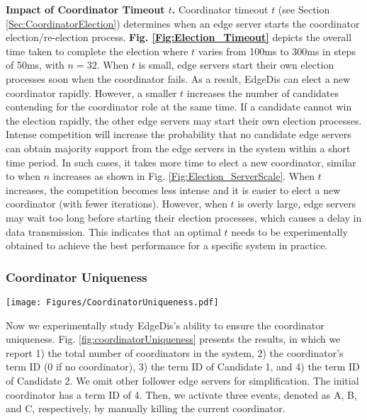 \documentclass[10pt,journal,compsoc]{IEEEtran}
\begin{document}
\smallskip
\textbf{Impact of Coordinator Timeout $t$.} Coordinator timeout $t$ (see Section \ref{Sec:CoordinatorElection}) determines when an edge server starts the coordinator election/re-election process. \textbf{Fig. \ref{Fig:Election_Timeout}} depicts the overall time taken to complete the election where $t$ varies from 100ms to 300ms in steps of 50ms, with $n=32$. When $t$ is small, edge servers start their own election processes soon when the coordinator fails. As a result, EdgeDis can elect a new coordinator rapidly. However, a smaller $t$ increases the number of candidates contending for the coordinator role at the same time. If a candidate cannot win the election rapidly, the other edge servers may start their own election processes. Intense competition will increase the probability that no candidate edge servers can obtain majority support from the edge servers in the system within a short time period. In such cases, it takes more time to elect a new coordinator, similar to when $n$ increases as shown in Fig. \ref{Fig:Election_ServerScale}. When $t$ increases, the competition becomes less intense and it is easier to elect a new coordinator (with fewer iterations). However, when $t$ is overly large, edge servers may wait too long before starting their election processes, which causes a delay in data transmission. This indicates that an optimal $t$ needs to be experimentally obtained to achieve the best performance for a specific system in practice.

\subsubsection{Coordinator Uniqueness}


\begin{figure*}[tbh]
    \centering
    \texttt{[image: Figures/CoordinatorUniqueness.pdf]}
    \vspace{-1em}
    \caption{Election Process to Ensure Coordinator Uniqueness. Two Candidates (1\&2) are Contending for Leadership.}
    \vspace{-1em}
    \label{fig:coordinatorUniqueness}
\end{figure*}


Now we experimentally study EdgeDis's ability to ensure the coordinator uniqueness. Fig. \ref{fig:coordinatorUniqueness} presents the results, in which we report 1) the total number of coordinators in the system, 2) the coordinator's term ID (0 if no coordinator), 3) the term ID of Candidate 1, and 4) the term ID of Candidate 2. We omit other follower edge servers for simplification. The initial coordinator has a term ID of 4. Then, we activate three events, denoted as A, B, and C, respectively, by manually killing the current coordinator.
\end{document}
